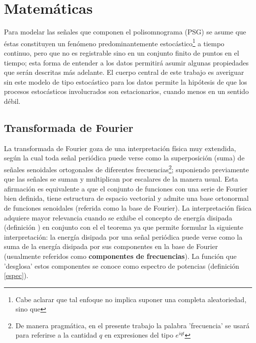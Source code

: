 
\section{Matemáticas}

Para modelar las se\~nales que componen el polisomnograma (PSG) se asume que éstas
constituyen un fen\'omeno predominantemente estocástico\footnote{Cabe aclarar que tal enfoque no
implica suponer una completa aleatoriedad, sino que} a tiempo 
continuo, pero que no es registrable sino en un conjunto finito de puntos en el tiempo; 
esta forma de entender a los datos 
permitir\'a asumir algunas propiedades que ser\'an descritas m\'as adelante.
%
El cuerpo central de este trabajo es averiguar sin este modelo de tipo estocástico para los datos
permite la hipótesis de que los procesos estocásticos involucrados son estacionarios, cuando menos en
un sentido débil.


\subsection{Transformada de Fourier}

La transformada de Fourier goza de una interpretaci\'on f\'isica muy extendida, seg\'un la cual 
toda se\~nal peri\'odica puede verse como la superposici\'on (suma) de se\~nales senoidales 
ortogonales de diferentes frecuencias\footnote{De manera pragm\'atica, en el presente trabajo la 
palabra  'frecuencia' se usar\'a para referirse a la cantidad $q$ en expresiones del tipo 
$e^{i q t}$}; suponiendo previamente que las se\~nales se suman y multiplican por escalares de la 
manera usual. 
Esta afirmaci\'on es equivalente a que el conjunto de funciones con una serie de Fourier bien 
definida, tiene estructura de espacio vectorial y admite una base ortonormal de funciones 
senoidales (referida como la base de Fourier). 
La interpretaci\'on f\'isica adquiere mayor relevancia cuando se exhibe el concepto de energ\'ia
disipada (definici\'on 
) en conjunto con el el teorema %
ya que 
permite formular la siguiente interpretaci\'on: la energ\'ia disipada por una se\~nal peri\'odica 
puede verse como la suma de la energ\'ia disipada por sus componentes en la base de Fourier 
(usualmente referidos como \textbf{componentes de frecuencias}).
La funci\'on que 'desglosa' estos componentes se conoce como espectro de potencias (definici\'on 
\ref{espec}).

